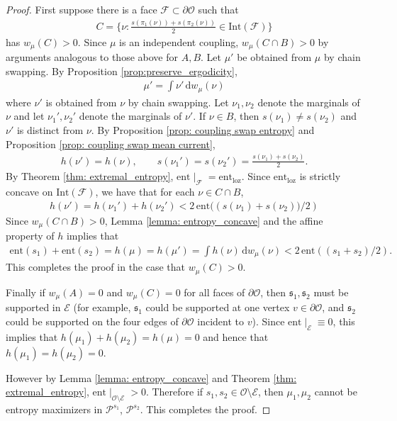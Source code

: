\documentclass[11pt]{article}
\theoremstyle{remark}
\theoremstyle{definition}
\newcommand{\ent}{\text{ent}}
\newcommand{\mc}[1]{\mathcal{#1}}
\newcommand{\dd}{\mathrm{d}}
\begin{document}
\begin{proof}
First suppose there is a face $\mc F\subset \partial \mc O$ such that 
\begin{align*}
    C = \{ \nu : \frac{s(\pi_1(\nu)) + s(\pi_2(\nu))}{2} \in \text{Int}(\mc F)\}
\end{align*}
has $w_\mu(C)>0$. Since $\mu$ is an independent coupling, $w_\mu(C\cap B)>0$ by arguments analogous to those above for $A,B$. Let $\mu'$ be obtained from $\mu$ by chain swapping. By Proposition \ref{prop:preserve_ergodicity}, 
\begin{align*}
    \mu' = \int \nu'\, \dd w_\mu(\nu)
\end{align*}
where $\nu'$ is obtained from $\nu$ by chain swapping. Let $\nu_1,\nu_2$ denote the marginals of $\nu$ and let $\nu_1',\nu_2'$ denote the marginals of $\nu'$. If $\nu \in B$, then $s(\nu_1)\neq s(\nu_2)$ and $\nu'$ is distinct from $\nu$. By Proposition \ref{prop: coupling swap entropy} and Proposition \ref{prop: coupling swap mean current},
\begin{align*}
    h(\nu') = h(\nu), \qquad  s(\nu_1') = s(\nu_2') = \frac{s(\nu_1)+s(\nu_2)}{2}.
\end{align*}
By Theorem \ref{thm: extremal_entropy}, $\ent\mid_{\mc F} = \ent_{\text{loz}}$. Since $\ent_{\text{loz}}$ is strictly concave on $\text{Int}(\mc F)$, we have that for each $\nu\in C\cap B$, 
\begin{align*}
    h(\nu') = h(\nu_1')+h(\nu_2') < 2\, \ent(({s(\nu_1)+s(\nu_2))}/{2})
\end{align*}
Since $w_\mu(C\cap B)>0$, Lemma \ref{lemma: entropy_concave} and the affine property of $h$ implies that 
\begin{align*}
    \ent(s_1) + \ent(s_2) = h(\mu) = h(\mu') = \int h(\nu) \, \dd w_\mu(\nu) < 2\,\ent( (s_1+s_2)/2).
\end{align*}
This completes the proof in the case that $w_\mu(C)>0$. 

Finally if $w_\mu(A) =0$ and $w_\mu(C)= 0$ for all faces of $\partial \mc O$, then $\mathfrak s_1, \mathfrak s_2$ must be supported in $\mc E$ (for example, $\mathfrak s_1$ could be supported at one vertex $v\in \partial \mc O$, and $\mathfrak s_2$ could be supported on the four edges of $\partial \mc O$ incident to $v$). Since $\ent\mid_{\mc E}\equiv 0$, this implies that $h(\mu_1) + h(\mu_2) = h(\mu) = 0$ and hence that $h(\mu_1)= h(\mu_2) = 0$. 

However by Lemma \ref{lemma: entropy_concave} and Theorem \ref{thm: extremal_entropy}, $\ent\mid_{\mc O\setminus \mc E}>0$. Therefore if $s_1,s_2\in \mc O\setminus \mc E$, then $\mu_1,\mu_2$ cannot be entropy maximizers in $\mc P^{s_1}$, $\mc P^{s_2}$. This completes the proof.
\end{proof}
\end{document}
